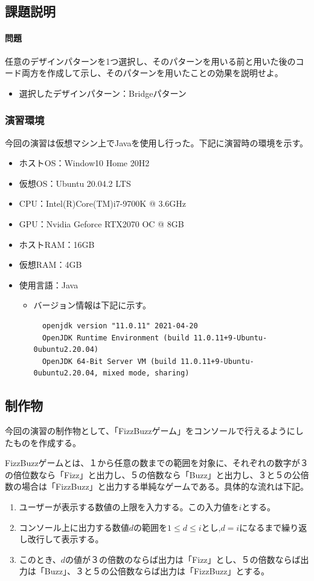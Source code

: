 \documentclass[dvipdfmx]{jsarticle}
\begin{document}
\subsection{課題説明}
\paragraph{問題} 任意のデザインパターンを1つ選択し、そのパターンを用いる前と用いた後のコード両方を作成して示し、そのパターンを用いたことの効果を説明せよ。
\begin{itemize}
  \item 選択したデザインパターン：Bridgeパターン
\end{itemize}

\subsubsection{演習環境}
今回の演習は仮想マシン上でJavaを使用し行った。下記に演習時の環境を示す。
\begin{itemize}
  \item ホストOS：Window10 Home 20H2
  \item 仮想OS：Ubuntu 20.04.2 LTS
  \item CPU：Intel(R)Core(TM)i7-9700K @ 3.6GHz
  \item GPU：Nvidia Geforce RTX2070 OC @ 8GB
  \item ホストRAM：16GB
  \item 仮想RAM：4GB
  \item 使用言語：Java
  \begin{itemize}
    \item バージョン情報は下記に示す。
    \begin{verbatim}
  openjdk version "11.0.11" 2021-04-20
  OpenJDK Runtime Environment (build 11.0.11+9-Ubuntu-0ubuntu2.20.04)
  OpenJDK 64-Bit Server VM (build 11.0.11+9-Ubuntu-0ubuntu2.20.04, mixed mode, sharing)
    \end{verbatim}
  \end{itemize}
\end{itemize}

\subsection{制作物}
今回の演習の制作物として、「FizzBuzzゲーム」をコンソールで行えるようにしたものを作成する。\par
FizzBuzzゲームとは、１から任意の数までの範囲を対象に、それぞれの数字が３の倍位数なら「Fizz」と出力し、５の倍数なら「Buzz」と出力し、３と５の公倍数の場合は「FizzBuzz」と出力する単純なゲームである。具体的な流れは下記。
\begin{enumerate}
  \item ユーザーが表示する数値の上限を入力する。この入力値を$i$とする。
  \item コンソール上に出力する数値$d$の範囲を$1 \leq d \leq i$とし,$d = i$になるまで繰り返し改行して表示する。
  \item このとき、$d$の値が３の倍数のならば出力は「Fizz」とし、５の倍数ならば出力は「Buzz」、３と５の公倍数ならば出力は「FizzBuzz」とする。
\end{enumerate}
\end{document}
